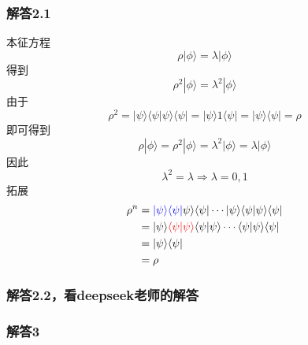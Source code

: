 \subsubsection{解答2.1}
本征方程
\begin{equation}
    \rho |\phi \rangle =\lambda |\phi \rangle 
\end{equation}
得到
\begin{equation}
    \rho ^2|\phi \rangle =\lambda ^2|\phi \rangle 
\end{equation}
由于
\begin{equation}
    \rho ^2=|\psi \rangle \langle \psi |\psi \rangle \langle \psi |=|\psi \rangle 1\langle \psi |=|\psi \rangle \langle \psi |=\rho 
\end{equation}
即可得到
\begin{equation}
    \rho |\phi \rangle =\rho ^2|\phi \rangle =\lambda ^2|\phi \rangle =\lambda |\phi \rangle 
\end{equation}
因此
\begin{equation}
    \lambda ^2=\lambda \Rightarrow \lambda =0,1
\end{equation}
拓展
\begin{equation}
    \begin{aligned}
        \rho ^n &={\color[RGB]{0, 0, 240} |\psi \rangle \langle \psi |}\psi \rangle \langle \psi |\cdots |\psi \rangle \langle \psi |\psi \rangle \langle \psi |
\\
&=|\psi \rangle {\color[RGB]{240, 0, 0} \langle \psi |\psi \rangle }\langle \psi |\psi \rangle \cdots \langle \psi |\psi \rangle \langle \psi |
\\
&=|\psi \rangle \langle \psi |
\\
&=\rho 
    \end{aligned}
\end{equation}


\subsubsection{解答2.2，看deepseek老师的解答}




\subsubsection{解答3}

